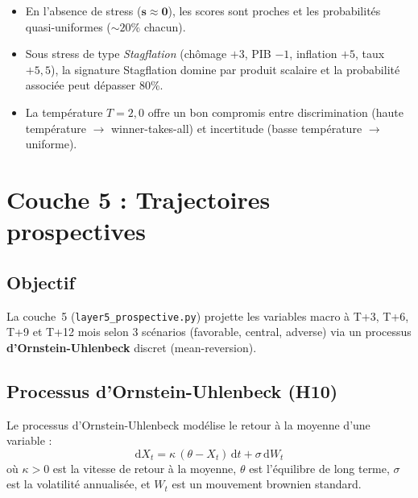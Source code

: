 \documentclass[12pt,a4paper]{article}
\begin{document}
\begin{interpretbox}
\begin{itemize}[nosep]
    \item En l'absence de stress ($\mathbf{s} \approx \mathbf{0}$), les scores
          sont proches et les probabilit\'es quasi-uniformes ($\sim 20\%$ chacun).
    \item Sous stress de type \emph{Stagflation} (ch\^omage $+3$, PIB $-1$,
          inflation $+5$, taux $+5{,}5$), la signature Stagflation domine par
          produit scalaire et la probabilit\'e associ\'ee peut d\'epasser 80\%.
    \item La temp\'erature $T = 2{,}0$ offre un bon compromis entre discrimination
          (haute temp\'erature $\to$ winner-takes-all) et incertitude
          (basse temp\'erature $\to$ uniforme).
\end{itemize}
\end{interpretbox}


\newpage
\section{Couche 5 : Trajectoires prospectives}

\subsection{Objectif}

La couche~5 (\texttt{layer5\_prospective.py}) projette les variables macro
\`a T+3, T+6, T+9 et T+12 mois selon 3 sc\'enarios (favorable, central, adverse)
via un processus \textbf{d'Ornstein-Uhlenbeck} discret (mean-reversion).

\subsection{Processus d'Ornstein-Uhlenbeck (H10)}

\begin{definitionbox}
Le processus d'Ornstein-Uhlenbeck mod\'elise le retour \`a la moyenne d'une variable :
\begin{equation}
    \mathrm{d}X_t = \kappa\,(\theta - X_t)\,\mathrm{d}t + \sigma\,\mathrm{d}W_t
    \label{eq:ou_continuous}
\end{equation}
o\`u $\kappa > 0$ est la vitesse de retour \`a la moyenne, $\theta$ est l'\'equilibre
de long terme, $\sigma$ est la volatilit\'e annualis\'ee, et $W_t$ est un mouvement
brownien standard.
\end{definitionbox}
\end{document}
